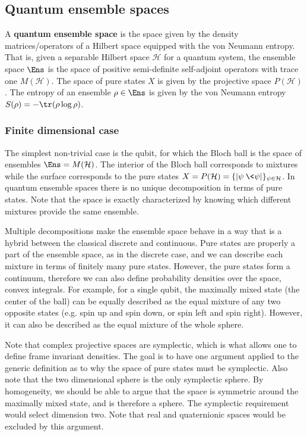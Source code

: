 \subsection{Quantum ensemble spaces}

\begin{defn}
	A \textbf{quantum ensemble space} is the space given by the density matrices/operators of a Hilbert space equipped with the von Neumann entropy. That is, given a separable Hilbert space $\mathcal{H}$ for a quantum system, the ensemble space $\Ens$ is the space of positive semi-definite self-adjoint operators with trace one $M(\mathcal{H})$. The space of pure states $X$ is given by the projective space $P(\mathcal{H})$. The entropy of an ensemble $\rho \in \Ens$ is given by the von Neumann entropy $S(\rho) = -\tr(\rho \log \rho)$.
\end{defn}

\subsubsection{Finite dimensional case}

The simplest non-trivial case is the qubit, for which the Bloch ball is the space of ensembles $\Ens = M(\mathcal{H})$. The interior of the Bloch ball corresponds to mixtures  while the surface corresponds to the pure states $X = P(\mathcal{H}) = \{ |\psi\> \<\psi| \}_{\psi \in \mathcal{H}}$. In quantum ensemble spaces there is no unique decomposition in terms of pure states. Note that the space is exactly characterized by knowing which different mixtures provide the same ensemble.

Multiple decompositions make the ensemble space behave in a way that is a hybrid between the classical discrete and continuous. Pure states are properly a part of the ensemble space, as in the discrete case, and we can describe each mixture in terms of finitely many pure states. However, the pure states form a continuum, therefore we can also define probability densities over the space, convex integrals. For example, for a single qubit, the maximally mixed state (the center of the ball) can be equally described as the equal mixture of any two opposite states (e.g. spin up and spin down, or spin left and spin right). However, it can also be described as the equal mixture of the whole sphere.

Note that complex projective spaces are symplectic, which is what allows one to define frame invariant densities. The goal is to have one argument applied to the generic definition as to why the space of pure states must be symplectic. Also note that the two dimensional sphere is the only symplectic sphere. By homogeneity, we should be able to argue that the space is symmetric around the maximally mixed state, and is therefore a sphere. The symplectic requirement would select dimension two. Note that real and quaternionic spaces would be excluded by this argument.

